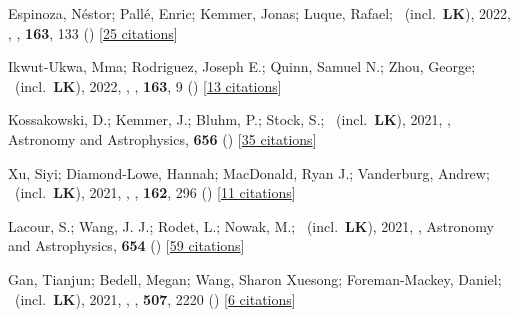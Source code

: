 \item[{\color{numcolor}\scriptsize63}] Espinoza, N{\'e}stor; Pall{\'e}, Enric; Kemmer, Jonas; Luque, Rafael; \etal\ (incl.\ \textbf{LK}), 2022, , \aj, \textbf{163}, 133 () [\href{https://ui.adsabs.harvard.edu/abs/2022AJ....163..133E}{25 citations}]

\item[{\color{numcolor}\scriptsize62}] Ikwut-Ukwa, Mma; Rodriguez, Joseph E.; Quinn, Samuel N.; Zhou, George; \etal\ (incl.\ \textbf{LK}), 2022, , \aj, \textbf{163}, 9 () [\href{https://ui.adsabs.harvard.edu/abs/2022AJ....163....9I}{13 citations}]

\item[{\color{numcolor}\scriptsize61}] Kossakowski, D.; Kemmer, J.; Bluhm, P.; Stock, S.; \etal\ (incl.\ \textbf{LK}), 2021, , Astronomy and Astrophysics, \textbf{656} () [\href{https://ui.adsabs.harvard.edu/abs/2021A&A...656A.124K}{35 citations}]

\item[{\color{numcolor}\scriptsize60}] Xu, Siyi; Diamond-Lowe, Hannah; MacDonald, Ryan J.; Vanderburg, Andrew; \etal\ (incl.\ \textbf{LK}), 2021, , \aj, \textbf{162}, 296 () [\href{https://ui.adsabs.harvard.edu/abs/2021AJ....162..296X}{11 citations}]

\item[{\color{numcolor}\scriptsize59}] Lacour, S.; Wang, J. J.; Rodet, L.; Nowak, M.; \etal\ (incl.\ \textbf{LK}), 2021, , Astronomy and Astrophysics, \textbf{654} () [\href{https://ui.adsabs.harvard.edu/abs/2021A&A...654L...2L}{59 citations}]

\item[{\color{numcolor}\scriptsize58}] Gan, Tianjun; Bedell, Megan; Wang, Sharon Xuesong; Foreman-Mackey, Daniel; \etal\ (incl.\ \textbf{LK}), 2021, , \mnras, \textbf{507}, 2220 () [\href{https://ui.adsabs.harvard.edu/abs/2021MNRAS.507.2220G}{6 citations}]

